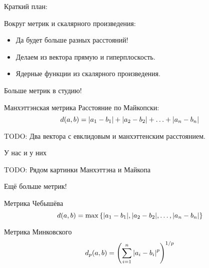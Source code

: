 \documentclass[14pt,xcolor=dvipsnames]{beamer}
\begin{document}
\begin{frame}{Краткий план:}

\begin{block}{Вокруг метрик и скалярного произведения:}
\begin{itemize}[<+->]
  \item Да будет больше разных расстояний!
  \item Делаем из вектора прямую и гиперплоскость.
  \item Ядерные функции из скалярного произведения.
\end{itemize}
\end{block}

\end{frame}


\begin{frame}{Больше метрик в студию!}
 \begin{block}{Манхэттэнская метрика}
  Расстояние по Майкопски:
  \[
  d(a, b) = \abs{a_1 - b_1}  + \abs{a_2 - b_2} + \ldots + \abs{a_n - b_n}
  \]
 \end{block}

\begin{block}{TODO:}
  Два вектора с евклидовым и манхэттенским расстоянием.
\end{block}
 
\end{frame}




\begin{frame}{У нас и у них}

 \begin{block}{TODO:}
 Рядом картинки Манхэттэна и Майкопа
 \end{block}

\end{frame}


\begin{frame}{Ещё больше метрик!}
\begin{block}{Метрика Чебышёва}
  \[
      d(a, b) = \max\left\{\abs{a_1 - b_1}, \abs{a_2 - b_2}, \ldots, \abs{a_n - b_n}\right\}
  \]
\end{block}
  
\begin{block}{Метрика Минковского}
  \[
      d_p(a, b) = \left(\sum_{i=1}^n\abs{a_i - b_i}^p\right)^{1/p}
  \]
\end{block}
\end{frame}
\end{document}
